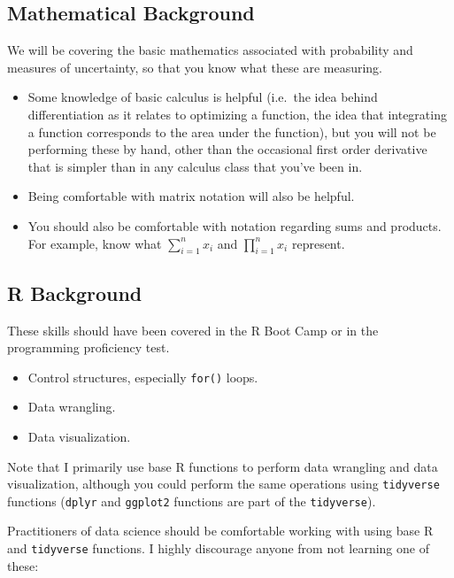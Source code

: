 \documentclass[
]{book}
\providecommand{\tightlist}{%
  \setlength{\itemsep}{0pt}\setlength{\parskip}{0pt}}
\begin{document}
\hypertarget{mathematical-background}{%
\subsection*{Mathematical Background}\label{mathematical-background}}

We will be covering the basic mathematics associated with probability and measures of uncertainty, so that you know what these are measuring.

\begin{itemize}
\item
  Some knowledge of basic calculus is helpful (i.e.~the idea behind differentiation as it relates to optimizing a function, the idea that integrating a function corresponds to the area under the function), but you will not be performing these by hand, other than the occasional first order derivative that is simpler than in any calculus class that you've been in.
\item
  Being comfortable with matrix notation will also be helpful.
\item
  You should also be comfortable with notation regarding sums and products. For example, know what \(\sum_{i=1}^n x_i\) and \(\prod_{i=1}^n x_i\) represent.
\end{itemize}

\hypertarget{r-background}{%
\subsection*{R Background}\label{r-background}}

These skills should have been covered in the R Boot Camp or in the programming proficiency test.

\begin{itemize}
\tightlist
\item
  Control structures, especially \texttt{for()} loops.
\item
  Data wrangling.
\item
  Data visualization.
\end{itemize}

Note that I primarily use base R functions to perform data wrangling and data visualization, although you could perform the same operations using \texttt{tidyverse} functions (\texttt{dplyr} and \texttt{ggplot2} functions are part of the \texttt{tidyverse}).

Practitioners of data science should be comfortable working with using base R and \texttt{tidyverse} functions. I highly discourage anyone from not learning one of these:
\end{document}
